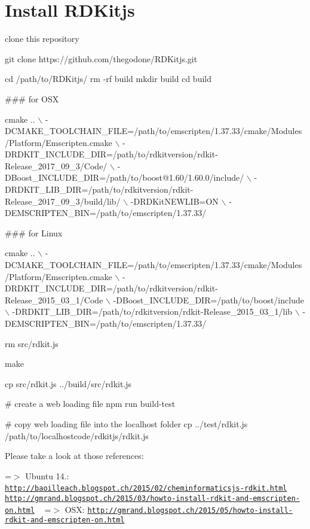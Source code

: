 \section*{Install R\+D\+Kitjs }

clone this repository 
\begin{DoxyCode}
git clone https://github.com/thegodone/RDKitjs.git


cd /path/to/RDKitjs/
rm -rf build
mkdir build
cd build
\end{DoxyCode}


\#\#\# for O\+SX 
\begin{DoxyCode}
cmake .. \(\backslash\)
-DCMAKE\_TOOLCHAIN\_FILE=/path/to/emscripten/1.37.33/cmake/Modules/Platform/Emscripten.cmake \(\backslash\)
-DRDKIT\_INCLUDE\_DIR=/path/to/rdkitversion/rdkit-Release\_2017\_09\_3/Code/ \(\backslash\)
-DBoost\_INCLUDE\_DIR=/path/to/boost@1.60/1.60.0/include/  \(\backslash\)
-DRDKIT\_LIB\_DIR=/path/to/rdkitversion/rdkit-Release\_2017\_09\_3/build/lib/ \(\backslash\)
-DRDKitNEWLIB=ON \(\backslash\)
-DEMSCRIPTEN\_BIN=/path/to/emscripten/1.37.33/
\end{DoxyCode}


\#\#\# for Linux 
\begin{DoxyCode}
cmake .. \(\backslash\)
-DCMAKE\_TOOLCHAIN\_FILE=/path/to/emscripten/1.37.33/cmake/Modules/Platform/Emscripten.cmake \(\backslash\)
-DRDKIT\_INCLUDE\_DIR=/path/to/rdkitversion/rdkit-Release\_2015\_03\_1/Code \(\backslash\)
-DBoost\_INCLUDE\_DIR=/path/to/boost/include \(\backslash\)
-DRDKIT\_LIB\_DIR=/path/to/rdkitversion/rdkit-Release\_2015\_03\_1/lib \(\backslash\)
-DEMSCRIPTEN\_BIN=/path/to/emscripten/1.37.33/
\end{DoxyCode}



\begin{DoxyCode}
rm src/rdkit.js

make

cp src/rdkit.js ../build/src/rdkit.js

# create a web loading file
npm run build-test

# copy web loading file into the localhost folder
cp ../test/rdkit.js /path/to/localhostcode/rdkitjs/rdkit.js
\end{DoxyCode}


Please take a look at those references\+:

=$>$ Ubuntu 14.\+: ~\newline
\href{http://baoilleach.blogspot.ch/2015/02/cheminformaticsjs-rdkit.html}{\tt http\+://baoilleach.\+blogspot.\+ch/2015/02/cheminformaticsjs-\/rdkit.\+html} ~\newline
 \href{http://gmrand.blogspot.ch/2015/03/howto-install-rdkit-and-emscripten-on.html}{\tt http\+://gmrand.\+blogspot.\+ch/2015/03/howto-\/install-\/rdkit-\/and-\/emscripten-\/on.\+html} ~\newline
 =$>$ O\+SX\+: \href{http://gmrand.blogspot.ch/2015/05/howto-install-rdkit-and-emscripten-on.html}{\tt http\+://gmrand.\+blogspot.\+ch/2015/05/howto-\/install-\/rdkit-\/and-\/emscripten-\/on.\+html}

